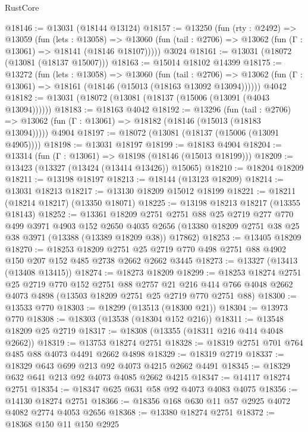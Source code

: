 \begin{lexlean}{RustCore}
\begin{coremodule}
@18146 := @13031 (@18144 @13124)
@18157 := @13250
    (fun (rty : @2492) =>
    @13059
      (fun (lets : @13058) =>
      @13060 (fun (tail : @2706) => @13062 (fun (Γ : @13061) => @18141 (@18146 @18107)))))
    @3024
@18161 := @13031 (@18072 (@13081 (@18137 @15007)))
@18163 := @15014 @18102 @14399
@18175 := @13272
    (fun (lets : @13058) =>
    @13060
      (fun (tail : @2706) =>
      @13062 (fun (Γ : @13061) => @18161 (@18146 (@15013 (@18163 @13092 @13094))))))
    @4042
@18182 := @13031 (@18072 (@13081 (@18137 (@15006 (@13091 (@4043 @13094))))))
@18183 := @18163 @4042
@18192 := @13296
    (fun (tail : @2706) => @13062 (fun (Γ : @13061) => @18182 (@18146 (@15013 (@18183 @13094)))))
    @4904
@18197 := @18072 (@13081 (@18137 (@15006 (@13091 @4905))))
@18198 := @13031 @18197
@18199 := @18183 @4904
@18204 := @13314 (fun (Γ : @13061) => @18198 (@18146 (@15013 @18199)))
@18209 := @13423 (@13327 (@13424 (@13414 @13426)) @15065)
@18210 := @18204 @18209
@18211 := @13198 @18197
@18213 := @18144 (@13123 @18209)
@18214 := @13031 @18213
@18217 := @13130 @18209 @15012 @18199
@18221 := @18211 (@18214 @18217) (@13350 @18071)
@18225 := @13198 @18213 @18217 (@13355 @18143)
@18252 := @13361
    @18209
    @2751
    @2751
    @88
    @25
    @2719
    @277
    @770
    @499
    @3971
    @4903
    @152
    @2650
    @4035
    @2656
    (@13380 @18209 @2751 @38 @25 @38 @3971 (@13388 (@13389 @18209 @38)) @17862)
@18253 := @13405 @18209
@18270 := @18253
    @18209
    @2751
    @25
    @2719
    @770
    @498
    @2751
    @88
    @4902
    @150
    @207
    @152
    @485
    @2738
    @2662
    @2662
    @3445
@18273 := @13327 (@13413 (@13408 @13415))
@18274 := @18273 @18209
@18299 := @18253
    @18274
    @2751
    @25
    @2719
    @770
    @152
    @2751
    @88
    @2757
    @21
    @216
    @414
    @766
    @4048
    @2662
    @4073
    @4898
    (@13503 @18209 @2751 @25 @2719 @770 @2751 @88)
@18300 := @13533 @770
@18303 := @18299 (@13513 (@18300 @21))
@18304 := @13973 @770
@18308 := @18303 (@13538 (@18304 @152 @216))
@18311 := @13548 @18209 @25 @2719
@18317 := @18308 (@13355 (@18311 @216 @414 @4048 @2662))
@18319 := @13753 @18274 @2751
@18328 := @18319 @2751 @701 @764 @485 @88 @4073 @4491 @2662 @4898
@18329 := @18319 @2719
@18337 := @18329 @643 @699 @213 @92 @4073 @4215 @2662 @4491
@18345 := @18329 @632 @641 @213 @92 @4073 @4085 @2662 @4215
@18347 := @14117 @18274 @2751
@18354 := @18347 @625 @631 @58 @92 @4073 @4083 @4075
@18356 := @14130 @18274 @2751
@18366 := @18356 @168 @630 @11 @57 @2925 @4072 @4082 @2774 @4053 @2656
@18368 := @13380 @18274 @2751
@18372 := @18368 @150 @11 @150 @2925

\end{coremodule}
\end{lexlean}
